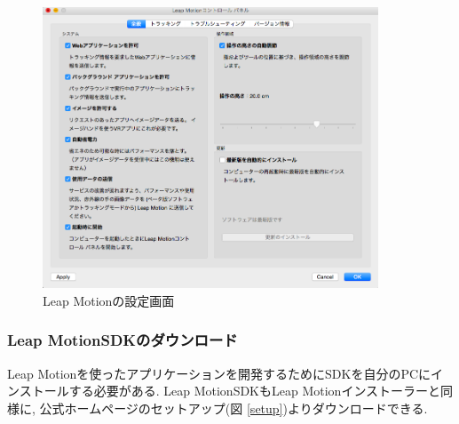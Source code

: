 \documentclass{funthesis}
\begin{document}
\begin{figure}[H]
 \begin{center}
  \includegraphics[width=100mm]{./img/Lset.png}
 \end{center}
 \caption{Leap Motionの設定画面}
 \label{Lset}
\end{figure}

\subsubsection{Leap MotionSDKのダウンロード}
Leap Motionを使ったアプリケーションを開発するためにSDKを自分のPCにインストールする必要がある. Leap MotionSDKもLeap Motionインストーラーと同様に, 公式ホームページのセットアップ(図 \ref{setup})よりダウンロードできる. 

\listoffigures

\listoftables
\end{document}
